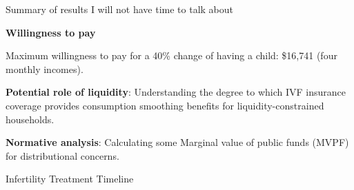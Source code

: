 \documentclass[notes,11pt, aspectratio=169]{beamer}
\newenvironment{wideitemize}{\itemize\addtolength{\itemsep}{0.4em}}{\enditemize}
\begin{document}
\begin{frame}{Summary of results I will not have time to talk about}
	\begin{wideitemize}
	\item \textbf{Willingness to pay}
		\begin{wideitemize}
		\item Maximum willingness to pay for a 40\% change of having a child: \$16,741 (four monthly incomes).
		\end{wideitemize}
	\item \textbf{Potential role of liquidity}: Understanding the degree to which IVF insurance coverage provides consumption smoothing benefits for liquidity-constrained households.
	\item \textbf{Normative analysis}: Calculating some Marginal value of public funds (MVPF) for distributional concerns.
	\end{wideitemize}	
\end{frame}

\begin{frame}{Infertility Treatment Timeline}
\centering
{}
\end{frame}
\end{document}
